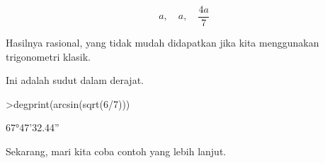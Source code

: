 \documentclass[a4paper,10pt]{article}
\begin{document}
\begin{eulernotebook}
\begin{eulercomment}
\begin{eulercomment}
\begin{eulercomment}
\begin{eulercomment}
\begin{eulercomment}
\begin{eulercomment}
\begin{eulercomment}
\begin{eulercomment}
\begin{eulercomment}
\begin{eulercomment}
\begin{eulercomment}
\begin{eulercomment}
\begin{eulercomment}
\begin{eulercomment}
\begin{eulercomment}
\begin{eulercomment}
\begin{eulercomment}
\begin{eulercomment}
\begin{eulercomment}
\begin{eulercomment}
\begin{eulercomment}
\begin{eulercomment}
\begin{eulercomment}
\begin{eulercomment}
\begin{eulercomment}
\begin{eulercomment}
\begin{eulercomment}
\begin{eulercomment}
\begin{eulercomment}
\begin{eulercomment}
\begin{eulercomment}
\begin{eulercomment}
\begin{eulercomment}
\begin{eulercomment}
\begin{eulercomment}
\begin{eulercomment}
\begin{eulercomment}
\begin{eulercomment}
\begin{eulercomment}
\begin{eulercomment}
\begin{eulercomment}
\end{eulercomment}
\begin{eulerformula}
\[
a, \quad a, \quad \frac{4a}{7}
\]
\end{eulerformula}
\begin{eulercomment}
Hasilnya rasional, yang tidak mudah didapatkan jika kita menggunakan
trigonometri klasik.
\end{eulercomment}
\begin{eulercomment}
Ini adalah sudut dalam derajat.
\end{eulercomment}
\begin{eulerprompt}
>degprint(arcsin(sqrt(6/7)))
\end{eulerprompt}
\begin{euleroutput}
  67°47'32.44''
\end{euleroutput}
\begin{eulercomment}
Sekarang, mari kita coba contoh yang lebih lanjut.


\end{eulercomment}
\end{eulercomment}
\end{eulercomment}
\end{eulercomment}
\end{eulercomment}
\end{eulercomment}
\end{eulercomment}
\end{eulercomment}
\end{eulercomment}
\end{eulercomment}
\end{eulercomment}
\end{eulercomment}
\end{eulercomment}
\end{eulercomment}
\end{eulercomment}
\end{eulercomment}
\end{eulercomment}
\end{eulercomment}
\end{eulercomment}
\end{eulercomment}
\end{eulercomment}
\end{eulercomment}
\end{eulercomment}
\end{eulercomment}
\end{eulercomment}
\end{eulercomment}
\end{eulercomment}
\end{eulercomment}
\end{eulercomment}
\end{eulercomment}
\end{eulercomment}
\end{eulercomment}
\end{eulercomment}
\end{eulercomment}
\end{eulercomment}
\end{eulercomment}
\end{eulercomment}
\end{eulercomment}
\end{eulercomment}
\end{eulercomment}
\end{eulercomment}
\end{eulernotebook}
\end{document}
